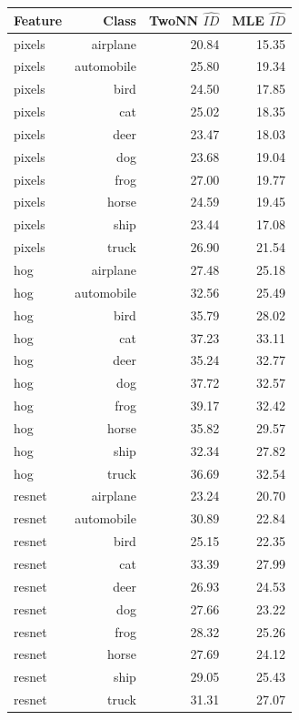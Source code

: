 \begin{tabular}{lrrr}
\toprule
Feature & Class & TwoNN $\hat{ID}$ & MLE $\hat{ID}$ \\
\midrule
pixels & airplane & 20.84 & 15.35 \\
pixels & automobile & 25.80 & 19.34 \\
pixels & bird & 24.50 & 17.85 \\
pixels & cat & 25.02 & 18.35 \\
pixels & deer & 23.47 & 18.03 \\
pixels & dog & 23.68 & 19.04 \\
pixels & frog & 27.00 & 19.77 \\
pixels & horse & 24.59 & 19.45 \\
pixels & ship & 23.44 & 17.08 \\
pixels & truck & 26.90 & 21.54 \\
hog & airplane & 27.48 & 25.18 \\
hog & automobile & 32.56 & 25.49 \\
hog & bird & 35.79 & 28.02 \\
hog & cat & 37.23 & 33.11 \\
hog & deer & 35.24 & 32.77 \\
hog & dog & 37.72 & 32.57 \\
hog & frog & 39.17 & 32.42 \\
hog & horse & 35.82 & 29.57 \\
hog & ship & 32.34 & 27.82 \\
hog & truck & 36.69 & 32.54 \\
resnet & airplane & 23.24 & 20.70 \\
resnet & automobile & 30.89 & 22.84 \\
resnet & bird & 25.15 & 22.35 \\
resnet & cat & 33.39 & 27.99 \\
resnet & deer & 26.93 & 24.53 \\
resnet & dog & 27.66 & 23.22 \\
resnet & frog & 28.32 & 25.26 \\
resnet & horse & 27.69 & 24.12 \\
resnet & ship & 29.05 & 25.43 \\
resnet & truck & 31.31 & 27.07 \\
\bottomrule
\end{tabular}
